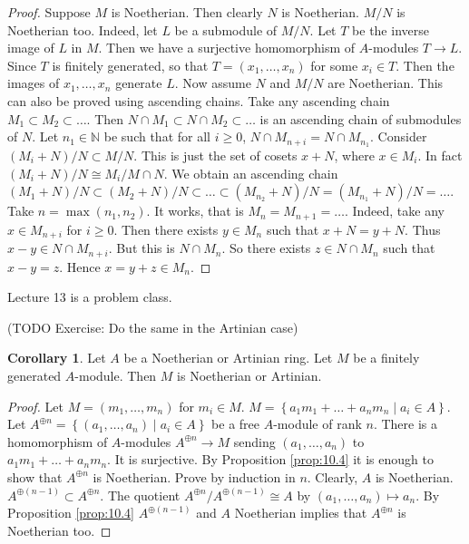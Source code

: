 \documentclass{article}
\newcommand{\N}{\mathbb{N}}
\newcommand{\rb}[1]{\left( #1 \right)}
\newcommand{\cb}[1]{\left\{ #1 \right\}}
\theoremstyle{definition}\newtheorem{definition}{Definition}[section]
\theoremstyle{definition}\newtheorem{remark}[definition]{Remark}
\theoremstyle{definition}\newtheorem*{example}{Example}
\theoremstyle{definition}\newtheorem*{note}{Note}
\newtheorem{corollary}[definition]{Corollary}
\begin{document}
\begin{proof}
Suppose $ M $ is Noetherian. Then clearly $ N $ is Noetherian. $ M / N $ is Noetherian too. Indeed, let $ L $ be a submodule of $ M / N $. Let $ T $ be the inverse image of $ L $ in $ M $. Then we have a surjective homomorphism of $ A $-modules $ T \to L $. Since $ T $ is finitely generated, so that $ T = \rb{x_1, \dots, x_n} $ for some $ x_i \in T $. Then the images of $ x_1, \dots, x_n $ generate $ L $. Now assume $ N $ and $ M / N $ are Noetherian. This can also be proved using ascending chains. Take any ascending chain $ M_1 \subset M_2 \subset \dots $. Then $ N \cap M_1 \subset N \cap M_2 \subset \dots $ is an ascending chain of submodules of $ N $. Let $ n_1 \in \N $ be such that for all $ i \ge 0 $, $ N \cap M_{n + i} = N \cap M_{n_1} $. Consider $ \rb{M_i + N} / N \subset M / N $. This is just the set of cosets $ x + N $, where $ x \in M_i $. In fact $ \rb{M_i + N} / N \cong M_i / M \cap N $. We obtain an ascending chain $ \rb{M_1 + N} / N \subset \rb{M_2 + N} / N \subset \dots \subset \rb{M_{n_2} + N} / N = \rb{M_{n_1} + N} / N = \dots $. Take $ n = \max\rb{n_1, n_2} $. It works, that is $ M_n = M_{n + 1} = \dots $. Indeed, take any $ x \in M_{n + i} $ for $ i \ge 0 $. Then there exists $ y \in M_n $ such that $ x + N = y + N $. Thus $ x - y \in N \cap M_{n + i} $. But this is $ N \cap M_n $. So there exists $ z \in N \cap M_n $ such that $ x - y = z $. Hence $ x = y + z \in M_n $.
\end{proof}


Lecture 13 is a problem class.


(TODO Exercise: Do the same in the Artinian case)

\begin{corollary}
Let $ A $ be a Noetherian or Artinian ring. Let $ M $ be a finitely generated $ A $-module. Then $ M $ is Noetherian or Artinian.
\end{corollary}

\begin{proof}
Let $ M = \rb{m_1, \dots, m_n} $ for $ m_i \in M $. $ M = \cb{a_1m_1 + \dots + a_nm_n \mid a_i \in A} $. Let $ A^{\oplus n} = \cb{\rb{a_1, \dots, a_n} \mid a_i \in A} $ be a free $ A $-module of rank $ n $. There is a homomorphism of $ A $-modules $ A^{\oplus n} \to M $ sending $ \rb{a_1, \dots, a_n} $ to $ a_1m_1 + \dots + a_nm_n $. It is surjective. By Proposition \ref{prop:10.4} it is enough to show that $ A^{\oplus n} $ is Noetherian. Prove by induction in $ n $. Clearly, $ A $ is Noetherian. $ A^{\oplus \rb{n - 1}} \subset A^{\oplus n} $. The quotient $ A^{\oplus n} / A^{\oplus \rb{n - 1}} \cong A $ by $ \rb{a_1, \dots, a_n} \mapsto a_n $. By Proposition \ref{prop:10.4} $ A^{\oplus \rb{n - 1}} $ and $ A $ Noetherian implies that $ A^{\oplus n} $ is Noetherian too.
\end{proof}
\end{document}
